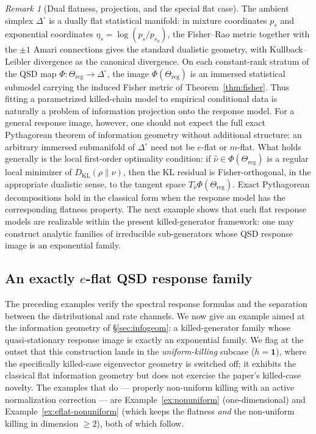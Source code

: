 \documentclass[11pt,reqno]{amsart}
\theoremstyle{plain}
\theoremstyle{definition}
\theoremstyle{remark}
\newtheorem{remark}[theorem]{Remark}
\newcommand{\Reg}{\Theta_{\mathrm{reg}}}
\newcommand{\Simp}{\Delta^{\!\circ}}
\newcommand{\one}{\mathbf{1}}
\newcommand{\KL}{D_{\mathrm{KL}}}
\begin{document}
\begin{remark}[Dual flatness, projection, and the special flat case]\label{rem:dually-flat}
The ambient simplex $\Simp$ is a dually flat statistical manifold: in mixture
coordinates $p_s$ and exponential coordinates $\eta_s=\log(p_s/p_{s_0})$, the
Fisher--Rao metric together with the $\pm 1$ Amari connections gives the standard
dualistic geometry, with Kullback--Leibler divergence as the canonical divergence.
On each constant-rank stratum of the QSD map $\Phi\colon\Reg\to\Simp$, the image
$\Phi(\Reg)$ is an immersed statistical submodel carrying the induced Fisher metric
of Theorem~\ref{thm:fisher}. Thus fitting a parametrized killed-chain model to
empirical conditional data is naturally a problem of information projection onto
the response model.
For a general response image, however, one should not expect the full exact
Pythagorean theorem of information geometry without additional structure: an
arbitrary immersed submanifold of $\Simp$ need not be $e$-flat or $m$-flat. What
holds generally is the local first-order optimality condition: if
$\hat\nu\in\Phi(\Reg)$ is a regular local minimizer of $\KL(\rho\|\nu)$, then the KL
residual is Fisher-orthogonal, in the appropriate dualistic sense, to the tangent
space $T_{\hat\nu}\Phi(\Reg)$. Exact Pythagorean decompositions hold in the
classical form when the response model has the corresponding flatness property. The
next example shows that such flat response models are realizable within the present
killed-generator framework: one may construct analytic
families of irreducible sub-generators whose QSD response image is an exponential
family.
\end{remark}

\subsection{An exactly $e$-flat QSD response family}\label{sec:eflat}
The preceding examples verify the spectral response formulas and the separation
between the distributional and rate channels. We now give an example aimed at the
information geometry of \S\ref{sec:infogeom}: a killed-generator family whose
quasi-stationary response image is exactly an exponential family. We flag at the
outset that this construction lands in the \emph{uniform-killing} subcase
($h=\one$), where the specifically killed-case eigenvector geometry is switched off;
it exhibits the classical flat information geometry but does not exercise the paper's
killed-case novelty. The examples that do --- properly non-uniform killing with an
active normalization correction --- are Example~\ref{ex:nonuniform} (one-dimensional)
and Example~\ref{ex:eflat-nonuniform} (which keeps the flatness \emph{and} the
non-uniform killing in dimension $\ge2$), both of which follow.
\end{document}
